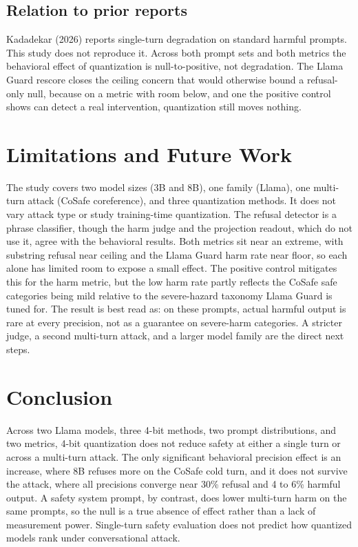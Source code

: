 \documentclass[10pt,twocolumn,letterpaper]{article}
\begin{document}
\subsection{Relation to prior reports}
Kadadekar (2026) reports single-turn degradation on standard harmful prompts. This
study does not reproduce it. Across both prompt sets and both metrics the
behavioral effect of quantization is null-to-positive, not degradation. The Llama
Guard rescore closes the ceiling concern that would otherwise bound a refusal-only
null, because on a metric with room below, and one the positive control shows can
detect a real intervention, quantization still moves nothing.

\section{Limitations and Future Work}
The study covers two model sizes (3B and 8B), one family (Llama), one multi-turn
attack (CoSafe coreference), and three quantization methods. It does not vary
attack type or study training-time quantization. The refusal detector is a phrase
classifier, though the harm judge and the projection readout, which do not use it,
agree with the behavioral results. Both metrics sit near an extreme, with
substring refusal near ceiling and the Llama Guard harm rate near floor, so each
alone has limited room to expose a small effect. The positive control mitigates
this for the harm metric, but the low harm rate partly reflects the CoSafe safe
categories being mild relative to the severe-hazard taxonomy Llama Guard is tuned
for. The result is best read as: on these prompts, actual harmful output is rare at
every precision, not as a guarantee on severe-harm categories. A stricter judge, a
second multi-turn attack, and a larger model family are the direct next steps.

\section{Conclusion}
Across two Llama models, three 4-bit methods, two prompt distributions, and two
metrics, 4-bit quantization does not reduce safety at either a single turn or
across a multi-turn attack. The only significant behavioral precision effect is an
increase, where 8B refuses more on the CoSafe cold turn, and it does not survive
the attack, where all precisions converge near 30\% refusal and 4 to 6\% harmful
output. A safety system prompt, by contrast, does lower multi-turn harm on the
same prompts, so the null is a true absence of effect rather than a lack of
measurement power. Single-turn safety evaluation does not predict how quantized
models rank under conversational attack.
\end{document}
